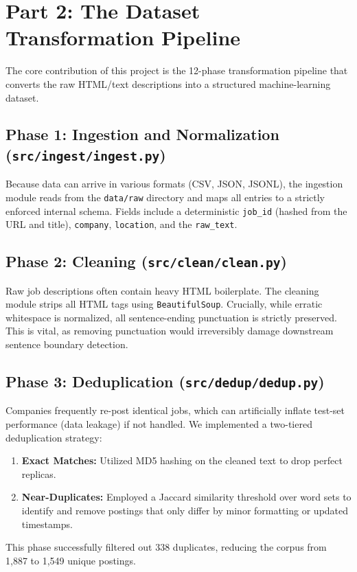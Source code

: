 \documentclass[11pt, a4paper]{article}
\begin{document}
\section{Part 2: The Dataset Transformation Pipeline}

The core contribution of this project is the 12-phase transformation pipeline that converts the raw HTML/text descriptions into a structured machine-learning dataset.

\subsection{Phase 1: Ingestion and Normalization (\texttt{src/ingest/ingest.py})}
Because data can arrive in various formats (CSV, JSON, JSONL), the ingestion module reads from the \texttt{data/raw} directory and maps all entries to a strictly enforced internal schema. Fields include a deterministic \texttt{job\_id} (hashed from the URL and title), \texttt{company}, \texttt{location}, and the \texttt{raw\_text}.

\subsection{Phase 2: Cleaning (\texttt{src/clean/clean.py})}
Raw job descriptions often contain heavy HTML boilerplate. The cleaning module strips all HTML tags using \texttt{BeautifulSoup}. Crucially, while erratic whitespace is normalized, all sentence-ending punctuation is strictly preserved. This is vital, as removing punctuation would irreversibly damage downstream sentence boundary detection.

\subsection{Phase 3: Deduplication (\texttt{src/dedup/dedup.py})}
Companies frequently re-post identical jobs, which can artificially inflate test-set performance (data leakage) if not handled. We implemented a two-tiered deduplication strategy:
\begin{enumerate}
    \item \textbf{Exact Matches:} Utilized MD5 hashing on the cleaned text to drop perfect replicas.
    \item \textbf{Near-Duplicates:} Employed a Jaccard similarity threshold over word sets to identify and remove postings that only differ by minor formatting or updated timestamps.
\end{enumerate}
This phase successfully filtered out 338 duplicates, reducing the corpus from 1,887 to 1,549 unique postings.
\end{document}
